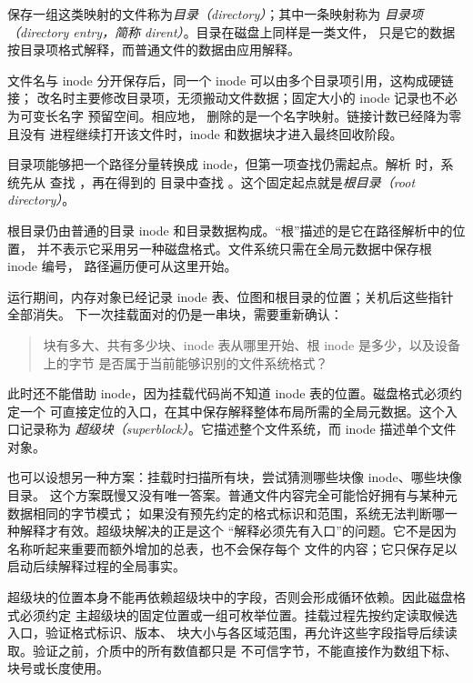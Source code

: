 保存一组这类映射的文件称为\emph{目录（directory）}；其中一条映射称为
\emph{目录项（directory entry，简称 dirent）}。目录在磁盘上同样是一类文件，
只是它的数据按目录项格式解释，而普通文件的数据由应用解释。

文件名与 inode 分开保存后，同一个 inode 可以由多个目录项引用，这构成硬链接；
改名时主要修改目录项，无须搬动文件数据；固定大小的 inode 记录也不必为可变长名字
预留空间。相应地， 删除的是一个名字映射。链接计数已经降为零且没有
进程继续打开该文件时，inode 和数据块才进入最终回收阶段。


目录项能够把一个路径分量转换成 inode，但第一项查找仍需起点。解析
 时，系统先从 \code{/} 查找 ，再在得到的
目录中查找 。这个固定起点就是\emph{根目录（root directory）}。

根目录仍由普通的目录 inode 和目录数据构成。“根”描述的是它在路径解析中的位置，
并不表示它采用另一种磁盘格式。文件系统只需在全局元数据中保存根 inode 编号，
路径遍历便可从这里开始。


运行期间，内存对象已经记录 inode 表、位图和根目录的位置；关机后这些指针全部消失。
下一次挂载面对的仍是一串块，需要重新确认：

\begin{quote}
块有多大、共有多少块、inode 表从哪里开始、根 inode 是多少，以及设备上的字节
是否属于当前能够识别的文件系统格式？
\end{quote}

此时还不能借助 inode，因为挂载代码尚不知道 inode 表的位置。磁盘格式必须约定一个
可直接定位的入口，在其中保存解释整体布局所需的全局元数据。这个入口记录称为
\emph{超级块（superblock）}。它描述整个文件系统，而 inode 描述单个文件对象。

也可以设想另一种方案：挂载时扫描所有块，尝试猜测哪些块像 inode、哪些块像目录。
这个方案既慢又没有唯一答案。普通文件内容完全可能恰好拥有与某种元数据相同的字节模式；
如果没有预先约定的格式标识和范围，系统无法判断哪一种解释才有效。超级块解决的正是这个
“解释必须先有入口”的问题。它不是因为名称听起来重要而额外增加的总表，也不会保存每个
文件的内容；它只保存足以启动后续解释过程的全局事实。

超级块的位置本身不能再依赖超级块中的字段，否则会形成循环依赖。因此磁盘格式必须约定
主超级块的固定位置或一组可枚举位置。挂载过程先按约定读取候选入口，验证格式标识、版本、
块大小与各区域范围，再允许这些字段指导后续读取。验证之前，介质中的所有数值都只是
不可信字节，不能直接作为数组下标、块号或长度使用。

